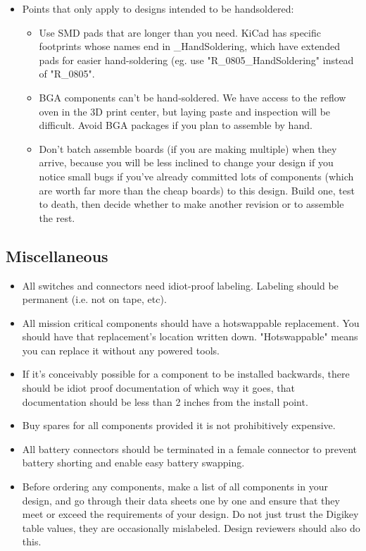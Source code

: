 \documentclass{article}
\begin{document}
\begin{itemize}
\item Points that only apply to designs intended to be handsoldered:
\begin{itemize}
\item Use SMD pads that are longer than you need. KiCad has specific footprints whose names end in \_HandSoldering, which have extended pads for easier hand-soldering (eg. use "R\_0805\_HandSoldering" instead of "R\_0805".
\item BGA components can't be hand-soldered. We have access to the reflow oven in the 3D print center, but laying paste and inspection will be difficult. Avoid BGA packages if you plan to assemble by hand.
\item Don't batch assemble boards (if you are making multiple) when they arrive, because you will be less inclined to change your design if you notice small bugs if you've already committed lots of components (which are worth far more than the cheap boards) to this design. Build one, test to death, then decide whether to make another revision or to assemble the rest.
\end{itemize}
\end{itemize}

\subsection{Miscellaneous}
\begin{itemize}
\item All switches and connectors need idiot-proof labeling. Labeling should be permanent (i.e. not on tape, etc).
\item All mission critical components should have a hotswappable replacement. You should have that replacement's location written down. "Hotswappable" means you can replace it without any powered tools.
\item If it's conceivably possible for a component to be installed backwards, there should be idiot proof documentation of which way it goes, that documentation should be less than 2 inches from the install point.
\item Buy spares for all components provided it is not prohibitively expensive.
\item All battery connectors should be terminated in a female connector to prevent battery shorting and enable easy battery swapping.
\item Before ordering any components, make a list of all components in your design, and go through their data sheets one by one and ensure that they meet or exceed the requirements of your design. Do not just trust the Digikey table values, they are occasionally mislabeled. Design reviewers should also do this.
\end{itemize}
\end{document}
